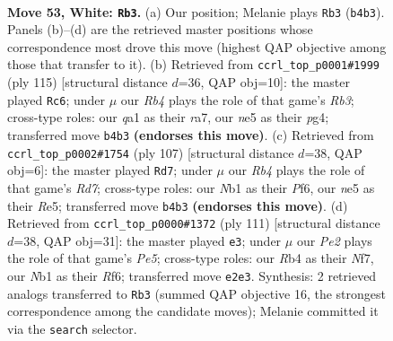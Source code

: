 \documentclass[11pt]{article}
\begin{document}
\clearpage

\begin{figure}[p]\centering
\begin{subfigure}{0.46\textwidth}\centering
\resizebox{\linewidth}{!}{%
\newchessgame
\chessboard[
  setfen={8/2k4p/8/p3nr2/1R1p4/8/4P3/qNK5 w - - 0 53},
  showmover=false,
  pgfstyle=straightmove, color=movearrow, markmove={b4-b3}
]}
\caption{}
\end{subfigure}\hfill
\begin{subfigure}{0.46\textwidth}\centering
\resizebox{\linewidth}{!}{%
\newchessgame
\chessboard[
  setfen={8/R3nk2/1r5p/8/5PP1/1P2K3/P7/8 b - - 9 58},
  showmover=false,
  pgfstyle=straightmove, color=movearrow, markmove={b6-c6}
]}
\caption{}
\end{subfigure}
\\[4pt]
\begin{subfigure}{0.46\textwidth}\centering
\resizebox{\linewidth}{!}{%
\newchessgame
\chessboard[
  setfen={8/5k2/5p2/4r3/2K4P/4PQ2/3r2P1/8 b - - 0 54},
  showmover=false,
  pgfstyle=straightmove, color=movearrow, markmove={d2-d7}
]}
\caption{}
\end{subfigure}\hfill
\begin{subfigure}{0.46\textwidth}\centering
\resizebox{\linewidth}{!}{%
\newchessgame
\chessboard[
  setfen={8/5nk1/5r2/8/3Qpp1P/8/5P2/5K2 b - - 1 56},
  showmover=false,
  pgfstyle=straightmove, color=movearrow, markmove={e4-e3}
]}
\caption{}
\end{subfigure}
\caption{\textbf{Move 53, White: \texttt{Rb3}.} (a) Our position; Melanie plays \texttt{Rb3} (\texttt{b4b3}). Panels (b)--(d) are the retrieved master positions whose correspondence most drove this move (highest QAP objective among those that transfer to it). (b) Retrieved from \texttt{ccrl\_top\_p0001\#1999} (ply 115) [structural distance $d$=36, QAP obj=10]: the master played \texttt{Rc6}; under $\mu$ our \emph{Rb4} plays the role of that game's \emph{Rb3}; cross-type roles: our \emph{q}a1 as their \emph{r}a7, our \emph{n}e5 as their \emph{p}g4; transferred move \texttt{b4b3} \textbf{(endorses this move)}. (c) Retrieved from \texttt{ccrl\_top\_p0002\#1754} (ply 107) [structural distance $d$=38, QAP obj=6]: the master played \texttt{Rd7}; under $\mu$ our \emph{Rb4} plays the role of that game's \emph{Rd7}; cross-type roles: our \emph{N}b1 as their \emph{P}f6, our \emph{n}e5 as their \emph{R}e5; transferred move \texttt{b4b3} \textbf{(endorses this move)}. (d) Retrieved from \texttt{ccrl\_top\_p0000\#1372} (ply 111) [structural distance $d$=38, QAP obj=31]: the master played \texttt{e3}; under $\mu$ our \emph{Pe2} plays the role of that game's \emph{Pe5}; cross-type roles: our \emph{R}b4 as their \emph{N}f7, our \emph{N}b1 as their \emph{R}f6; transferred move \texttt{e2e3}. Synthesis: 2 retrieved analogs transferred to \texttt{Rb3} (summed QAP objective 16, the strongest correspondence among the candidate moves); Melanie committed it via the \texttt{search} selector.}
\label{fig:thought-m104}
\end{figure}
\end{document}
